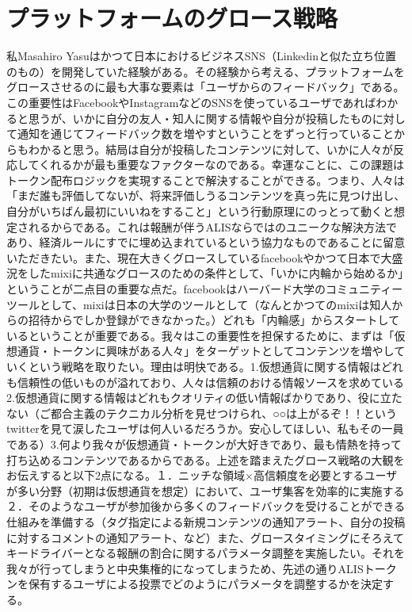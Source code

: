 \documentclass{jsarticle}
\begin{document}
\section{プラットフォームのグロース戦略}
私Masahiro Yasuはかつて日本におけるビジネスSNS（Linkedinと似た立ち位置のもの）を開発していた経験がある。その経験から考える、プラットフォームをグロースさせるのに最も大事な要素は「ユーザからのフィードバック」である。この重要性はFacebookやInstagramなどのSNSを使っているユーザであればわかると思うが、いかに自分の友人・知人に関する情報や自分が投稿したものに対して通知を通じてフィードバック数を増やすということをずっと行っていることからもわかると思う。結局は自分が投稿したコンテンツに対して、いかに人々が反応してくれるかが最も重要なファクターなのである。幸運なことに、この課題はトークン配布ロジックを実現することで解決することができる。つまり、人々は「まだ誰も評価してないが、将来評価しうるコンテンツを真っ先に見つけ出し、自分がいちばん最初にいいねをすること」という行動原理にのっとって動くと想定されるからである。これは報酬が伴うALISならではのユニークな解決方法であり、経済ルールにすでに埋め込まれているという協力なものであることに留意いただきたい。また、現在大きくグロースしているfacebookやかつて日本で大盛況をしたmixiに共通なグロースのための条件として、「いかに内輪から始めるか」ということが二点目の重要な点だ。facebookはハーバード大学のコミュニティーツールとして、mixiは日本の大学のツールとして（なんとかつてのmixiは知人からの招待からでしか登録ができなかった。）どれも「内輪感」からスタートしているということが重要である。我々はこの重要性を担保するために、まずは「仮想通貨・トークンに興味がある人々」をターゲットとしてコンテンツを増やしていくという戦略を取りたい。理由は明快である。1.仮想通貨に関する情報はどれも信頼性の低いものが溢れており、人々は信頼のおける情報ソースを求めている2.仮想通貨に関する情報はどれもクオリティの低い情報ばかりであり、役に立たない（ご都合主義のテクニカル分析を見せつけられ、○○は上がるぞ！！というtwitterを見て涙したユーザは何人いるだろうか。安心してほしい、私もその一員である）3.何より我々が仮想通貨・トークンが大好きであり、最も情熱を持って打ち込めるコンテンツであるからである。上述を踏まえたグロース戦略の大観をお伝えすると以下2点になる。１．ニッチな領域×高信頼度を必要とするユーザが多い分野（初期は仮想通貨を想定）において、ユーザ集客を効率的に実施する ２．そのようなユーザが参加後から多くのフィードバックを受けることができる仕組みを準備する（タグ指定による新規コンテンツの通知アラート、自分の投稿に対するコメントの通知アラート、など）また、グロースタイミングにそろえてキードライバーとなる報酬の割合に関するパラメータ調整を実施したい。それを我々が行ってしまうと中央集権的になってしまうため、先述の通りALISトークンを保有するユーザによる投票でどのようにパラメータを調整するかを決定する。
\end{document}
